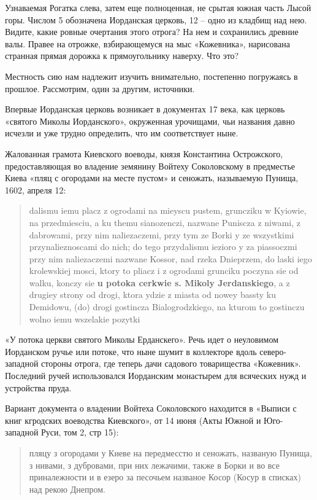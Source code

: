 Узнаваемая Рогатка слева, затем еще полноценная, не срытая южная часть Лысой горы. Числом 5 обозначена Иорданская церковь, 12 – одно из кладбищ над нею. Видите, какие ровные очертания этого отрога? На нем и сохранились древние валы. Правее на отрожке, взбирающемуся на мыс «Кожевника», нарисована странная прямая дорожка к прямоугольнику наверху. Что это? 

Местность сию нам надлежит изучить внимательно, постепенно погружаясь в прошлое. Рассмотрим, один за другим, источники.

Впервые Иорданская церковь возникает в документах 17 века, как церковь «святого Миколы Иорданского», окруженная урочищами, чьи названия давно исчезли и уже трудно определить, что им соответствует ныне.

Жалованная грамота Киевского воеводы, князя Константина Острожского, предоставляющая во владение земянину Войтеху Соколовскому в предместье Киева «пляц с огородами на месте пустом» и сеножать, называемую Пунища, 1602, апреля 12:
\begin{otherlanguage}{polish}
\begin{quotation}
dalismu iemu placz z ogrodami na mieyscu pustem, gruncziku w Kyiowie, na przedmiesciu, a ku themu sianozenczi, nazwane Puniscza z niwami, z dabrowami, przy nim naliezaczemi, przy tym ze Borki y ze wszystkimi przynalieznoscami do nich; do tego przydalismu iezioro y za piassoczmi przy nim naliezaczemi nazwane Kossor, nad rzeka Dnieprzem, do laski iego krolewskiej mosci, ktory to pliacz i z ogrodami grunciku poczyna sie od walku, konczy sie \textbf{u potoka cerkwie s. Mikoly Jerdan\-skiego}, a z drugiey strony od drogi, ktora ydzie z miasta od nowey bassty ku Demidowu, (do) drogi gostincza Bialogrodzkiego, na kturom to gostinczu wolno iemu wszelakie pozytki
\end{quotation}
\end{otherlanguage}

«У потока церкви святого Миколы Ерданскего». Речь идет о неуловимом Иорданском ручье или потоке, что ныне шумит в коллекторе вдоль северо-западной стороны отрога, где теперь дачи садового товарищества «Кожевник». Последний ручей использовался Иорданским монастырем для всяческих нужд и устройства пруда.

Вариант документа о владении Войтеха Соколовского находится в «Выписи с книг кгродских воеводства Киевского», от 14 июня (Акты Южной и Юго-западной Руси, том 2, стр 15):

\begin{quotation}
пляцу з огородами у Киеве на передмесстю и сеножать, названую Пунища, з нивами, з дубровами, при них лежачими, также в Борки и во все приналежности и в езеро за песочьем названое Косор (Косур в списках) над рекою Днепром.
\end{quotation}

